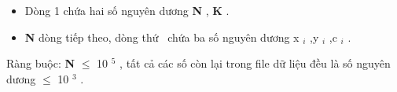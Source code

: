 \begin{itemize}
	\item     Dòng 1 chứa hai số nguyên dương    \textbf{     N    }    ,    \textbf{     K    }    .   
	\item \textbf{     N    }    dòng tiếp theo, dòng thứ     chứa ba số nguyên dương x    $_     i    $    ,y    $_     i    $    ,c    $_     i    $    .   
\end{itemize}

   Ràng buộc:   \textbf{    N   }    $\le$ 10   $^    5   $   , tất cả các số còn lại trong file dữ liệu đều là số nguyên dương  $\le$ 10   $^    3   $   .